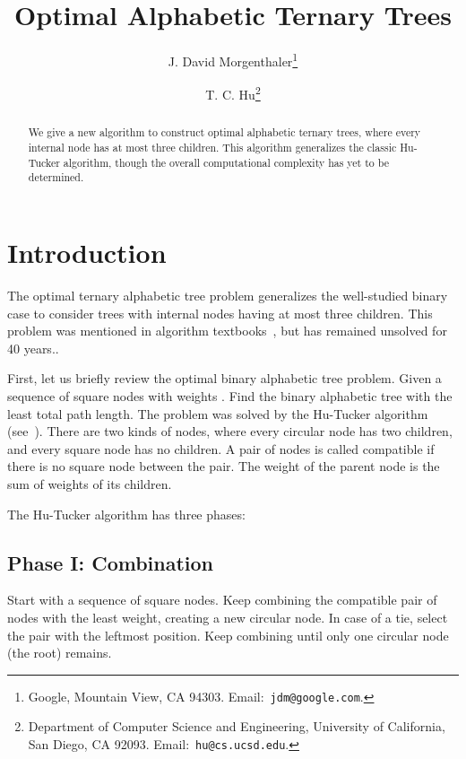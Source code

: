 \documentclass[12pt]{article}
\begin{document}
\title{Optimal Alphabetic Ternary Trees}
\author{ J. David Morgenthaler\thanks{Google, Mountain View, CA 94303. 
	 Email:~{\tt jdm@google.com}. } 
\and 	 
	 T. C. Hu\thanks{Department of Computer Science and Engineering,
	 University of California, San Diego, CA 92093. 
	 Email:~{\tt hu@cs.ucsd.edu}. }
}
\maketitle

\begin{abstract}
We give a new algorithm to construct optimal alphabetic ternary trees, where
every internal node has at most three children. This algorithm generalizes the
classic Hu-Tucker algorithm, though the overall computational complexity has yet
to be determined.

\end{abstract}

\section{Introduction}

The optimal ternary alphabetic tree problem generalizes the well-studied binary
case to consider trees with internal nodes having at most three children. This
problem was mentioned in algorithm textbooks~\cite{hu02, knuth73}, but has
remained unsolved for 40 years..

First, let us briefly review the optimal binary alphabetic tree problem.
Given a sequence of square nodes with weights .
Find the binary alphabetic tree with the least total path length.
The problem was solved by the Hu-Tucker algorithm (see~\cite{hu02, hu71}).
There are two kinds of nodes, where every circular node has two children,
and every square node has no children.  A pair of nodes is called compatible
if there is no square node between the pair. The weight of the parent node
is the sum of weights of its children.

The Hu-Tucker algorithm has three phases:
 
\subsection*{Phase I: Combination}

Start with a sequence of  square nodes. Keep combining the compatible pair
of nodes with the least weight, creating a new circular node.  In case of a tie,
select the pair with the leftmost position. Keep combining until only one
circular node (the root) remains.
\end{document}
